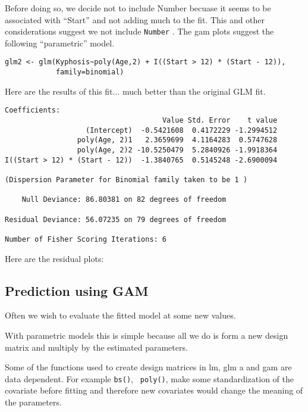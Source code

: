 Before doing so, we decide not to include Number becuase it seems to
be associated with ``Start'' and not adding much to the fit. 
This and other considerations suggest we not include {\tt Number}
. The gam
plots suggest the following ``parametric'' model.

\renewcommand{\baselinestretch}{1}
 

\begin{verbatim}
glm2 <- glm(Kyphosis~poly(Age,2) + I((Start > 12) * (Start - 12)),
            family=binomial)
\end{verbatim}
\renewcommand{\baselinestretch}{2}

Here are the results of this fit... much better than the original
GLM fit.

\renewcommand{\baselinestretch}{1}
\begin{verbatim}
Coefficients:
                                     Value Std. Error    t value 
                   (Intercept)  -0.5421608  0.4172229 -1.2994512
                 poly(Age, 2)1   2.3659699  4.1164283  0.5747628
                 poly(Age, 2)2 -10.5250479  5.2840926 -1.9918364
I((Start > 12) * (Start - 12))  -1.3840765  0.5145248 -2.6900094

(Dispersion Parameter for Binomial family taken to be 1 )

    Null Deviance: 86.80381 on 82 degrees of freedom

Residual Deviance: 56.07235 on 79 degrees of freedom

Number of Fisher Scoring Iterations: 6 
\end{verbatim}
\renewcommand{\baselinestretch}{1}

Here are the residual plots:

\centerline{}

\subsection{Prediction using GAM}
Often we wish to evaluate the fitted model at some new values.

With parametric models this is simple because all we do is form a
new design matrix and multiply by the estimated parameters.

Some of the functions used to create design matrices in lm, glm a
and gam are data dependent. For example {\tt bs()}, {\tt
  poly()}, make some standardization of the covariate before fitting
and therefore new covariates would change the meaning of the parameters.

